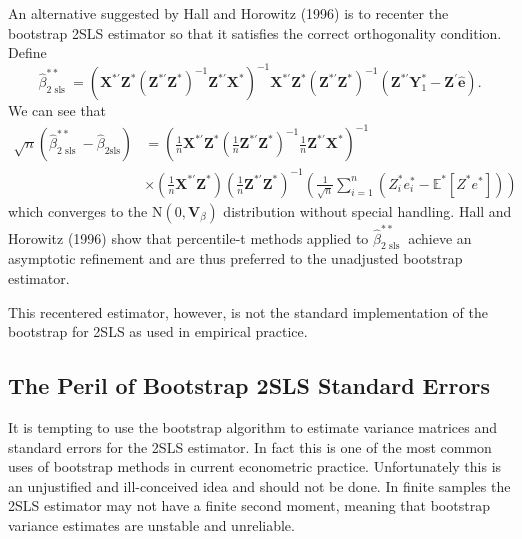 \documentclass[10pt]{article}
\begin{document}
An alternative suggested by Hall and Horowitz (1996) is to recenter the bootstrap 2SLS estimator so that it satisfies the correct orthogonality condition. Define
$$
\widehat{\beta}_{2 \text { sls }}^{* *}=\left(\boldsymbol{X}^{* \prime} \boldsymbol{Z}^{*}\left(\boldsymbol{Z}^{* \prime} \boldsymbol{Z}^{*}\right)^{-1} \boldsymbol{Z}^{* \prime} \boldsymbol{X}^{*}\right)^{-1} \boldsymbol{X}^{* \prime} \boldsymbol{Z}^{*}\left(\boldsymbol{Z}^{* \prime} \boldsymbol{Z}^{*}\right)^{-1}\left(\boldsymbol{Z}^{* \prime} \boldsymbol{Y}_{1}^{*}-\boldsymbol{Z}^{\prime} \widehat{\boldsymbol{e}}\right) .
$$
We can see that
$$
\begin{aligned}
\sqrt{n}\left(\widehat{\beta}_{2 \text { sls }}^{* *}-\widehat{\beta}_{2 \mathrm{sls}}\right) &=\left(\frac{1}{n} \boldsymbol{X}^{* \prime} \boldsymbol{Z}^{*}\left(\frac{1}{n} \boldsymbol{Z}^{* \prime} \boldsymbol{Z}^{*}\right)^{-1} \frac{1}{n} \boldsymbol{Z}^{* \prime} \boldsymbol{X}^{*}\right)^{-1} \\
& \times\left(\frac{1}{n} \boldsymbol{X}^{* \prime} \boldsymbol{Z}^{*}\right)\left(\frac{1}{n} \boldsymbol{Z}^{* \prime} \boldsymbol{Z}^{*}\right)^{-1}\left(\frac{1}{\sqrt{n}} \sum_{i=1}^{n}\left(Z_{i}^{*} e_{i}^{*}-\mathbb{E}^{*}\left[Z^{*} e^{*}\right]\right)\right)
\end{aligned}
$$
which converges to the $\mathrm{N}\left(0, \boldsymbol{V}_{\beta}\right)$ distribution without special handling. Hall and Horowitz (1996) show that percentile-t methods applied to $\widehat{\beta}_{2 \text { sls }}^{* *}$ achieve an asymptotic refinement and are thus preferred to the unadjusted bootstrap estimator.

This recentered estimator, however, is not the standard implementation of the bootstrap for 2SLS as used in empirical practice.

\subsection{The Peril of Bootstrap 2SLS Standard Errors}
It is tempting to use the bootstrap algorithm to estimate variance matrices and standard errors for the 2SLS estimator. In fact this is one of the most common uses of bootstrap methods in current econometric practice. Unfortunately this is an unjustified and ill-conceived idea and should not be done. In finite samples the 2SLS estimator may not have a finite second moment, meaning that bootstrap variance estimates are unstable and unreliable.
\end{document}
